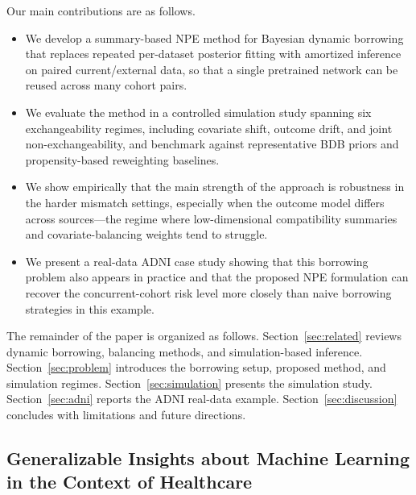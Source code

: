 Our main contributions are as follows.
\begin{itemize}[leftmargin=1.5em, itemsep=2pt]
  \item We develop a summary-based NPE method for Bayesian dynamic
        borrowing that replaces repeated per-dataset posterior fitting with
        amortized inference on paired current/external data, so that a
        single pretrained network can be reused across many cohort pairs.
  \item We evaluate the method in a controlled simulation study spanning
        six exchangeability regimes, including covariate shift, outcome
        drift, and joint non-exchangeability, and benchmark against
        representative BDB priors and propensity-based reweighting
        baselines.
  \item We show empirically that the main strength of the approach is
        robustness in the harder mismatch settings, especially when the
        outcome model differs across sources---the regime where low-dimensional
        compatibility summaries and covariate-balancing weights tend to
        struggle.
  \item We present a real-data ADNI case study showing that this borrowing
        problem also appears in practice and that the proposed NPE
        formulation can recover the concurrent-cohort risk level more
        closely than naive borrowing strategies in this example.
\end{itemize}

The remainder of the paper is organized as follows.
Section~\ref{sec:related} reviews dynamic borrowing, balancing methods, and
simulation-based inference.
Section~\ref{sec:problem} introduces the borrowing setup, proposed method,
and simulation regimes.
Section~\ref{sec:simulation} presents the simulation study.
Section~\ref{sec:adni} reports the ADNI real-data example.
Section~\ref{sec:discussion} concludes with limitations and future directions.

\subsection*{Generalizable Insights about Machine Learning in the Context
             of Healthcare}

